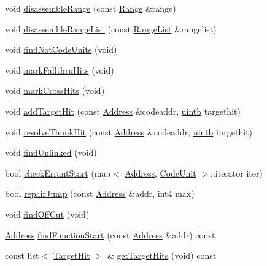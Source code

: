 \begin{DoxyCompactItemize}
\item 
void \mbox{\hyperlink{class_code_data_analysis_a723b35a19d5263fbcc3ed8b31e244758}{disassemble\+Range}} (const \mbox{\hyperlink{class_range}{Range}} \&range)
\item 
void \mbox{\hyperlink{class_code_data_analysis_a150d37b82ebb1e11dea740e5b0d370d5}{disassemble\+Range\+List}} (const \mbox{\hyperlink{class_range_list}{Range\+List}} \&rangelist)
\item 
void \mbox{\hyperlink{class_code_data_analysis_ae2dec2b15124c18ebc197f1e21efe357}{find\+Not\+Code\+Units}} (void)
\item 
void \mbox{\hyperlink{class_code_data_analysis_acfa3dd51339107e25b206a6b7f5fd3ab}{mark\+Fallthru\+Hits}} (void)
\item 
void \mbox{\hyperlink{class_code_data_analysis_a1ac3f1a95c3c0ad7a59e15d1027f9909}{mark\+Cross\+Hits}} (void)
\item 
void \mbox{\hyperlink{class_code_data_analysis_aa393f0d01fea19b3249d4a282bd17b52}{add\+Target\+Hit}} (const \mbox{\hyperlink{class_address}{Address}} \&codeaddr, \mbox{\hyperlink{types_8h_a2db313c5d32a12b01d26ac9b3bca178f}{uintb}} targethit)
\item 
void \mbox{\hyperlink{class_code_data_analysis_ad565b8a13360e457de73216e3556b583}{resolve\+Thunk\+Hit}} (const \mbox{\hyperlink{class_address}{Address}} \&codeaddr, \mbox{\hyperlink{types_8h_a2db313c5d32a12b01d26ac9b3bca178f}{uintb}} targethit)
\item 
void \mbox{\hyperlink{class_code_data_analysis_a0e11a53182ac0d58d9fc3d9e8231e61e}{find\+Unlinked}} (void)
\item 
bool \mbox{\hyperlink{class_code_data_analysis_ab41f0acf673f7cff1aac362a5be63899}{check\+Errant\+Start}} (map$<$ \mbox{\hyperlink{class_address}{Address}}, \mbox{\hyperlink{class_code_unit}{Code\+Unit}} $>$\+::iterator iter)
\item 
bool \mbox{\hyperlink{class_code_data_analysis_a0c1f590455ec5bdd79d45bfe73b0a640}{repair\+Jump}} (const \mbox{\hyperlink{class_address}{Address}} \&addr, int4 max)
\item 
void \mbox{\hyperlink{class_code_data_analysis_ad069e36b39959763921b330663387d3c}{find\+Off\+Cut}} (void)
\item 
\mbox{\hyperlink{class_address}{Address}} \mbox{\hyperlink{class_code_data_analysis_ac296d58998c63e13db49b6164dabc21d}{find\+Function\+Start}} (const \mbox{\hyperlink{class_address}{Address}} \&addr) const
\item 
const list$<$ \mbox{\hyperlink{class_target_hit}{Target\+Hit}} $>$ \& \mbox{\hyperlink{class_code_data_analysis_a22b2269201919435d22089b292976e56}{get\+Target\+Hits}} (void) const

\end{DoxyCompactItemize}

